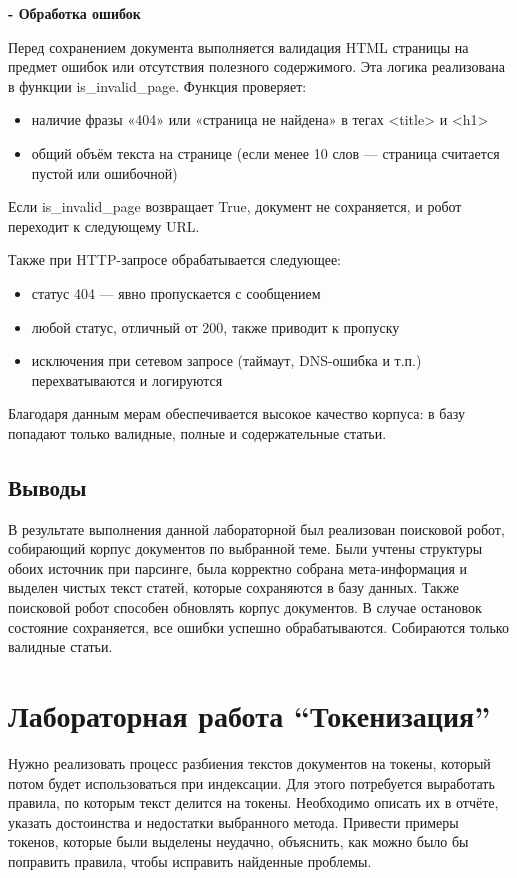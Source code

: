 \documentclass[pdf, unicode, 12pt, a4paper, oneside, fleqn]{article}
\begin{document}
\textbf{- Обработка ошибок}

Перед сохранением документа выполняется валидация HTML
страницы на предмет ошибок или отсутствия полезного содержимого. Эта 
логика реализована в функции is\_invalid\_page. Функция проверяет:
\begin{itemize}
    \item наличие фразы «404» или «страница не найдена» в тегах <title> и <h1>
    \item общий объём текста на странице (если менее 10 слов — страница 
    считается пустой или ошибочной) 
\end{itemize}
Если is\_invalid\_page возвращает True, документ не сохраняется, и 
робот переходит к следующему URL. 

Также при HTTP-запросе обрабатывается следующее: 
\begin{itemize}
    \item статус 404 — явно пропускается с сообщением
    \item любой статус, отличный от 200, также приводит к пропуску
    \item исключения при сетевом запросе (таймаут, DNS-ошибка и т.п.) 
    перехватываются и логируются
\end{itemize}
Благодаря данным мерам обеспечивается высокое качество корпуса: 
в базу попадают только валидные, полные и содержательные статьи. 

\subsection*{Выводы}

В результате выполнения данной лабораторной был реализован 
поисковой робот, собирающий корпус документов по выбранной теме. 
Были учтены структуры обоих источник при парсинге, была корректно 
собрана мета-информация и выделен чистых текст статей, которые 
сохраняются в базу данных. Также поисковой робот способен обновлять 
корпус документов. В случае остановок состояние сохраняется, все ошибки 
успешно обрабатываются. Собираются только валидные статьи.

\pagebreak

\section{Лабораторная работа  \enquote{Токенизация}}

Нужно реализовать процесс разбиения текстов 
документов на токены, который потом будет использоваться при 
индексации. Для этого потребуется выработать правила, по которым текст 
делится на токены. Необходимо описать их в отчёте, указать достоинства и недостатки выбранного метода. Привести примеры токенов, которые были 
выделены неудачно, объяснить, как можно было бы поправить правила, 
чтобы исправить найденные проблемы. 
\end{document}

